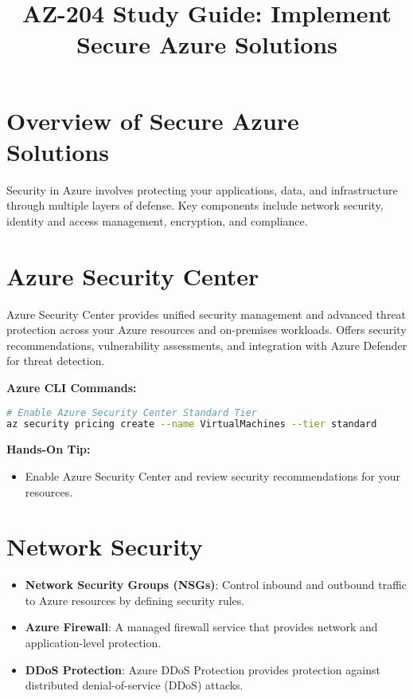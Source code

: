\documentclass{article}
\title{AZ-204 Study Guide: Implement Secure Azure Solutions}
\author{}
\date{}
\begin{document}
\maketitle

\section{Overview of Secure Azure Solutions}
Security in Azure involves protecting your applications, data, and infrastructure through multiple layers of defense. Key components include network security, identity and access management, encryption, and compliance.

\section{Azure Security Center}
Azure Security Center provides unified security management and advanced threat protection across your Azure resources and on-premises workloads. Offers security recommendations, vulnerability assessments, and integration with Azure Defender for threat detection.

\textbf{Azure CLI Commands:}
\begin{lstlisting}[language=bash]
# Enable Azure Security Center Standard Tier
az security pricing create --name VirtualMachines --tier standard
\end{lstlisting}

\textbf{Hands-On Tip:}
\begin{itemize}
    \item Enable Azure Security Center and review security recommendations for your resources.
\end{itemize}

\section{Network Security}
\begin{itemize}
    \item \textbf{Network Security Groups (NSGs)}: Control inbound and outbound traffic to Azure resources by defining security rules.
    \item \textbf{Azure Firewall}: A managed firewall service that provides network and application-level protection.
    \item \textbf{DDoS Protection}: Azure DDoS Protection provides protection against distributed denial-of-service (DDoS) attacks.
\end{itemize}
\end{document}

